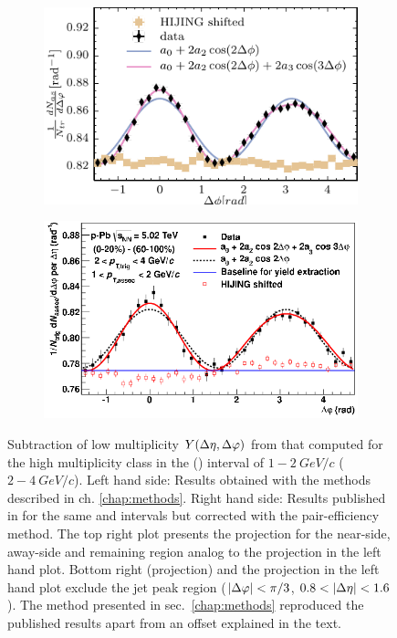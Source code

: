 \begin{figure}
\begin{subfigure}[b]{0.5\textwidth}
  \end{subfigure}
  \begin{subfigure}[b]{0.5\textwidth}
    \includegraphics[width=\textwidth]{figures/subtraction_px_12_24_nothresh.pdf}
  \end{subfigure}%
  \begin{subfigure}[b]{0.5\textwidth}
    \includegraphics[width=\textwidth]{figures/figures_ALICE_paper/projection_to_phi_without_peak.png}
  \end{subfigure}
  \caption[Subtraction of low multiplicity $Y(\deta, \dphi )$ from that computed for the high multiplicity class in the \ptassoc (\pttrig) interval of $1-\SI{2}{GeV/c}$ ($2-\SI{4}{GeV/c}$) and no threshold.]{Subtraction of low multiplicity $Y(\deta, \dphi )$ from that computed for the high multiplicity class in the \ptassoc (\pttrig) interval of $1-\SI{2}{GeV/c}$ ($2-\SI{4}{GeV/c}$). Left hand side: Results obtained with the methods described in ch. \ref{chap:methods}. Right hand side: Results published in \cite{Abelev2012} for the same \ptassoc and \pttrig intervals but corrected with the pair-efficiency method. The top right plot presents the \deta projection for the \gls{near-side}, \gls{away-side} and remaining region analog to the \deta projection in the left hand plot. Bottom right (\dphi projection) and the \dphi projection in the left hand plot exclude the jet peak region ($|\Delta\varphi| < \pi /3$, $0.8 < |\Delta\eta| < 1.6$). The method presented in sec.~\ref{chap:methods}  reproduced the published results apart from an offset explained in the text.}
  \label{fig:comparison_to_pub}
\end{figure}

